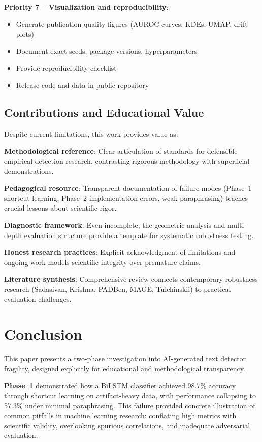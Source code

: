 \documentclass[conference]{IEEEtran}
\begin{document}
\textbf{Priority 7 – Visualization and reproducibility}:
\begin{itemize}
    \item Generate publication-quality figures (AUROC curves, KDEs, UMAP, drift plots)
    \item Document exact seeds, package versions, hyperparameters
    \item Provide reproducibility checklist
    \item Release code and data in public repository
\end{itemize}

\subsection{Contributions and Educational Value}

Despite current limitations, this work provides value as:

\textbf{Methodological reference}: Clear articulation of standards for defensible empirical detection research, contrasting rigorous methodology with superficial demonstrations.

\textbf{Pedagogical resource}: Transparent documentation of failure modes (Phase~1 shortcut learning, Phase~2 implementation errors, weak paraphrasing) teaches crucial lessons about scientific rigor.

\textbf{Diagnostic framework}: Even incomplete, the geometric analysis and multi-depth evaluation structure provide a template for systematic robustness testing.

\textbf{Honest research practices}: Explicit acknowledgment of limitations and ongoing work models scientific integrity over premature claims.

\textbf{Literature synthesis}: Comprehensive review connects contemporary robustness research (Sadasivan, Krishna, PADBen, MAGE, Tulchinskii) to practical evaluation challenges.

\section{Conclusion}

This paper presents a two-phase investigation into AI-generated text detector fragility, designed explicitly for educational and methodological transparency.

\textbf{Phase~1} demonstrated how a BiLSTM classifier achieved 98.7\% accuracy through shortcut learning on artifact-heavy data, with performance collapsing to 57.3\% under minimal paraphrasing. This failure provided concrete illustration of common pitfalls in machine learning research: conflating high metrics with scientific validity, overlooking spurious correlations, and inadequate adversarial evaluation.
\end{document}
